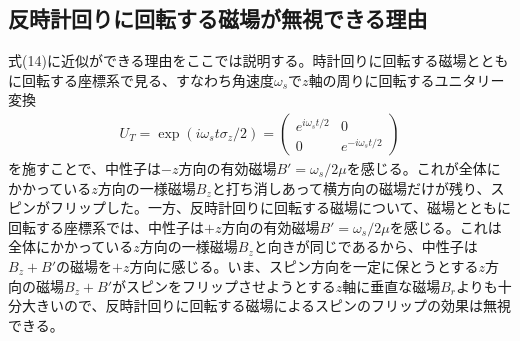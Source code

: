 \subsection{反時計回りに回転する磁場が無視できる理由}
式(14)に近似ができる理由をここでは説明する。時計回りに回転する磁場とともに回転する座標系で見る、すなわち角速度$\omega_{s}$で$z$軸の周りに回転するユニタリー変換
\begin{align}
U_{T}=\exp(i\omega_{s}t{\sigma}_{z}/2)=
\begin{pmatrix}
e^{i\omega_{s}t/2} &0 \\
0 &e^{-i\omega_{s}t/2}
\end{pmatrix}
\end{align}
を施すことで、中性子は$-z$方向の有効磁場$B'=\omega_{s}/2{\mu}$を感じる。これが全体にかかっている$z$方向の一様磁場$B_{z}$と打ち消しあって横方向の磁場だけが残り、スピンがフリップした。一方、反時計回りに回転する磁場について、磁場とともに回転する座標系では、中性子は$+z$方向の有効磁場$B'=\omega_{s}/2{\mu}$を感じる。これは全体にかかっている$z$方向の一様磁場$B_{z}$と向きが同じであるから、中性子は$B_{z}+B'$の磁場を$+z$方向に感じる。いま、スピン方向を一定に保とうとする$z$方向の磁場$B_{z}+B'$がスピンをフリップさせようとする$z$軸に垂直な磁場$B_{r}$よりも十分大きいので、反時計回りに回転する磁場によるスピンのフリップの効果は無視できる。


